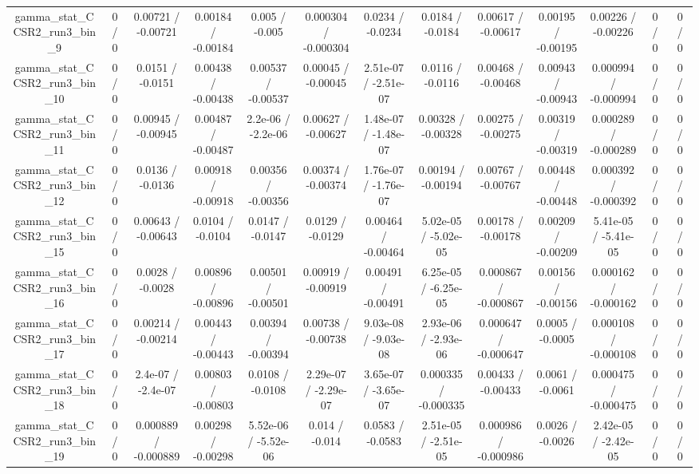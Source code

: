 \documentclass[10pt]{article}
\begin{document}
\begin{table}[htbp]
\begin{center}
\begin{tabular}{|c|c|c|c|c|c|c|c|c|c|c|c|c|}
  gamma_stat_CCSR2_run3_bin_9 & 0 / 0 & 0.00721 / -0.00721 & 0.00184 / -0.00184 & 0.005 / -0.005 & 0.000304 / -0.000304 & 0.0234 / -0.0234 & 0.0184 / -0.0184 & 0.00617 / -0.00617 & 0.00195 / -0.00195 & 0.00226 / -0.00226 & 0 / 0 & 0 / 0 \\ 
  gamma_stat_CCSR2_run3_bin_10 & 0 / 0 & 0.0151 / -0.0151 & 0.00438 / -0.00438 & 0.00537 / -0.00537 & 0.00045 / -0.00045 & 2.51e-07 / -2.51e-07 & 0.0116 / -0.0116 & 0.00468 / -0.00468 & 0.00943 / -0.00943 & 0.000994 / -0.000994 & 0 / 0 & 0 / 0 \\ 
  gamma_stat_CCSR2_run3_bin_11 & 0 / 0 & 0.00945 / -0.00945 & 0.00487 / -0.00487 & 2.2e-06 / -2.2e-06 & 0.00627 / -0.00627 & 1.48e-07 / -1.48e-07 & 0.00328 / -0.00328 & 0.00275 / -0.00275 & 0.00319 / -0.00319 & 0.000289 / -0.000289 & 0 / 0 & 0 / 0 \\ 
  gamma_stat_CCSR2_run3_bin_12 & 0 / 0 & 0.0136 / -0.0136 & 0.00918 / -0.00918 & 0.00356 / -0.00356 & 0.00374 / -0.00374 & 1.76e-07 / -1.76e-07 & 0.00194 / -0.00194 & 0.00767 / -0.00767 & 0.00448 / -0.00448 & 0.000392 / -0.000392 & 0 / 0 & 0 / 0 \\ 
  gamma_stat_CCSR2_run3_bin_15 & 0 / 0 & 0.00643 / -0.00643 & 0.0104 / -0.0104 & 0.0147 / -0.0147 & 0.0129 / -0.0129 & 0.00464 / -0.00464 & 5.02e-05 / -5.02e-05 & 0.00178 / -0.00178 & 0.00209 / -0.00209 & 5.41e-05 / -5.41e-05 & 0 / 0 & 0 / 0 \\ 
  gamma_stat_CCSR2_run3_bin_16 & 0 / 0 & 0.0028 / -0.0028 & 0.00896 / -0.00896 & 0.00501 / -0.00501 & 0.00919 / -0.00919 & 0.00491 / -0.00491 & 6.25e-05 / -6.25e-05 & 0.000867 / -0.000867 & 0.00156 / -0.00156 & 0.000162 / -0.000162 & 0 / 0 & 0 / 0 \\ 
  gamma_stat_CCSR2_run3_bin_17 & 0 / 0 & 0.00214 / -0.00214 & 0.00443 / -0.00443 & 0.00394 / -0.00394 & 0.00738 / -0.00738 & 9.03e-08 / -9.03e-08 & 2.93e-06 / -2.93e-06 & 0.000647 / -0.000647 & 0.0005 / -0.0005 & 0.000108 / -0.000108 & 0 / 0 & 0 / 0 \\ 
  gamma_stat_CCSR2_run3_bin_18 & 0 / 0 & 2.4e-07 / -2.4e-07 & 0.00803 / -0.00803 & 0.0108 / -0.0108 & 2.29e-07 / -2.29e-07 & 3.65e-07 / -3.65e-07 & 0.000335 / -0.000335 & 0.00433 / -0.00433 & 0.0061 / -0.0061 & 0.000475 / -0.000475 & 0 / 0 & 0 / 0 \\ 
  gamma_stat_CCSR2_run3_bin_19 & 0 / 0 & 0.000889 / -0.000889 & 0.00298 / -0.00298 & 5.52e-06 / -5.52e-06 & 0.014 / -0.014 & 0.0583 / -0.0583 & 2.51e-05 / -2.51e-05 & 0.000986 / -0.000986 & 0.0026 / -0.0026 & 2.42e-05 / -2.42e-05 & 0 / 0 & 0 / 0 \\ 

\end{tabular}
\end{center}
\end{table}
\end{document}
